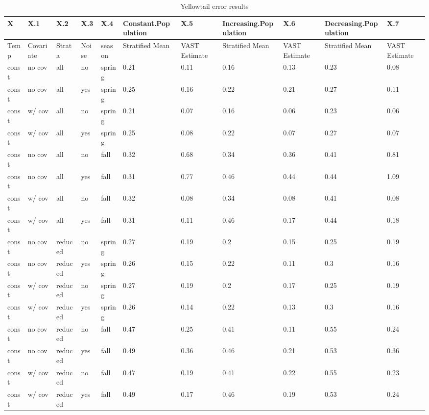 \documentclass[
  12pt,
]{article}
\begin{document}
\begin{table}

\caption{\label{tab:unnamed-chunk-1}Yellowtail error results}
\centering
\begin{tabular}[t]{l|l|l|l|l|l|l|l|l|l|l}
\hline
X & X.1 & X.2 & X.3 & X.4 & Constant.Population & X.5 & Increasing.Population & X.6 & Decreasing.Population & X.7\\
\hline
Temp & Covariate & Strata & Noise & season & Stratified Mean & VAST Estimate & Stratified Mean & VAST Estimate & Stratified Mean & VAST Estimate\\
\hline
const & no cov & all & no & spring & 0.21 & 0.11 & 0.16 & 0.13 & 0.23 & 0.08\\
\hline
const & no cov & all & yes & spring & 0.25 & 0.16 & 0.22 & 0.21 & 0.27 & 0.11\\
\hline
const & w/ cov & all & no & spring & 0.21 & 0.07 & 0.16 & 0.06 & 0.23 & 0.06\\
\hline
const & w/ cov & all & yes & spring & 0.25 & 0.08 & 0.22 & 0.07 & 0.27 & 0.07\\
\hline
const & no cov & all & no & fall & 0.32 & 0.68 & 0.34 & 0.36 & 0.41 & 0.81\\
\hline
const & no cov & all & yes & fall & 0.31 & 0.77 & 0.46 & 0.44 & 0.44 & 1.09\\
\hline
const & w/ cov & all & no & fall & 0.32 & 0.08 & 0.34 & 0.08 & 0.41 & 0.08\\
\hline
const & w/ cov & all & yes & fall & 0.31 & 0.11 & 0.46 & 0.17 & 0.44 & 0.18\\
\hline
const & no cov & reduced & no & spring & 0.27 & 0.19 & 0.2 & 0.15 & 0.25 & 0.19\\
\hline
const & no cov & reduced & yes & spring & 0.26 & 0.15 & 0.22 & 0.11 & 0.3 & 0.16\\
\hline
const & w/ cov & reduced & no & spring & 0.27 & 0.19 & 0.2 & 0.17 & 0.25 & 0.19\\
\hline
const & w/ cov & reduced & yes & spring & 0.26 & 0.14 & 0.22 & 0.13 & 0.3 & 0.16\\
\hline
const & no cov & reduced & no & fall & 0.47 & 0.25 & 0.41 & 0.11 & 0.55 & 0.24\\
\hline
const & no cov & reduced & yes & fall & 0.49 & 0.36 & 0.46 & 0.21 & 0.53 & 0.36\\
\hline
const & w/ cov & reduced & no & fall & 0.47 & 0.19 & 0.41 & 0.22 & 0.55 & 0.23\\
\hline
const & w/ cov & reduced & yes & fall & 0.49 & 0.17 & 0.46 & 0.19 & 0.53 & 0.24\\

\end{tabular}
\end{table}
\end{document}

